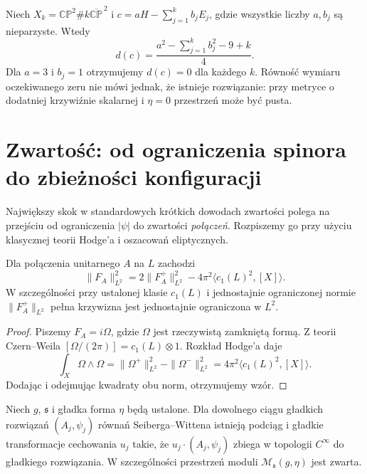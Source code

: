 \begin{przyklad}
Niech $X_k=\mathbb{CP}^2\#k\overline{\mathbb{CP}}^{\,2}$
i $c=aH-\sum_{j=1}^k b_jE_j$, gdzie wszystkie liczby
$a,b_j$ są nieparzyste. Wtedy
\[
d(c)=\frac{a^2-\sum_{j=1}^k b_j^2-9+k}{4}.
\]
Dla $a=3$ i $b_j=1$ otrzymujemy $d(c)=0$ dla każdego $k$.
Równość wymiaru oczekiwanego zeru nie mówi jednak,
że istnieje rozwiązanie: przy metryce o dodatniej
krzywiźnie skalarnej i $\eta=0$ przestrzeń może być pusta.
\end{przyklad}

\section{Zwartość: od ograniczenia spinora do zbieżności konfiguracji}
\label{sec:tg-sw12-compact}

Największy skok w standardowych krótkich dowodach
zwartości polega na przejściu od ograniczenia $|\psi|$
do zwartości \emph{połączeń}. Rozpiszemy go przy użyciu
klasycznej teorii Hodge'a i oszacowań eliptycznych.

\begin{lemat}
\label{lem:tg-sw12-curvature}
Dla połączenia unitarnego $A$ na $L$ zachodzi
\[
\|F_A\|_{L^2}^2=2\|F_A^+\|_{L^2}^2
-4\pi^2\langle c_1(L)^2,[X]\rangle.
\]
W szczególności przy ustalonej klasie $c_1(L)$
i jednostajnie ograniczonej normie $\|F_A^+\|_{L^2}$
pełna krzywizna jest jednostajnie ograniczona w $L^2$.
\end{lemat}

\begin{proof}
Piszemy $F_A=i\Omega$, gdzie $\Omega$ jest rzeczywistą
zamkniętą formą. Z teorii Czern--Weila
$[\Omega/(2\pi)]=c_1(L)\otimes1$.
Rozkład Hodge'a daje
\[
\int_X\Omega\wedge\Omega
=\|\Omega^+\|_{L^2}^2-\|\Omega^-\|_{L^2}^2
=4\pi^2\langle c_1(L)^2,[X]\rangle.
\]
Dodając i odejmując kwadraty obu norm, otrzymujemy wzór.
\end{proof}

\begin{twierdzenie}
\label{thm:tg-sw12-compact}
Niech $g$, $\mathfrak s$ i gładka forma $\eta$ będą ustalone.
Dla dowolnego ciągu gładkich rozwiązań
$(A_j,\psi_j)$ równań Seiberga--Wittena istnieją podciąg
i gładkie transformacje cechowania $u_j$ takie, że
$u_j\cdot(A_j,\psi_j)$ zbiega w topologii $C^\infty$
do gładkiego rozwiązania. W szczególności przestrzeń
moduli $\mathcal M_{\mathfrak s}(g,\eta)$ jest zwarta.
\end{twierdzenie}

